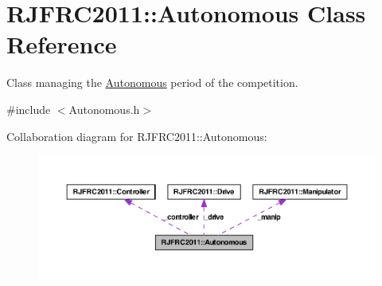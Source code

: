 \hypertarget{class_r_j_f_r_c2011_1_1_autonomous}{
\section{RJFRC2011::Autonomous Class Reference}
\label{class_r_j_f_r_c2011_1_1_autonomous}
}


Class managing the \hyperlink{class_r_j_f_r_c2011_1_1_autonomous}{Autonomous} period of the competition.  




{\ttfamily \#include $<$Autonomous.h$>$}



Collaboration diagram for RJFRC2011::Autonomous:\nopagebreak
\begin{figure}[H]
\begin{center}
\leavevmode
\includegraphics[width=400pt]{class_r_j_f_r_c2011_1_1_autonomous__coll__graph}
\end{center}
\end{figure}
